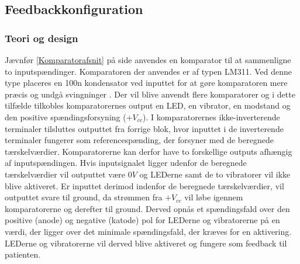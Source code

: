 \subsection{Feedbackkonfiguration}
\subsubsection{Teori og design}
Jævnfør \ref{Komparatorafsnit} på side \pageref{Komparatorafsnit} anvendes en komparator til at sammenligne to inputspændinger. Komparatoren der anvendes er af typen LM311. Ved denne type placeres en 100n kondensator ved inputtet for at gøre komparatoren mere præcis og undgå svingninger \cite{Instruments2015}. Der vil blive anvendt flere komparatorer og i dette tilfælde tilkobles komparatorernes output en LED, en vibrator, en modstand og den positive spændingsforsyning ($+V_{cc}$). I komparatorernes ikke-inverterende terminaler tilsluttes outputtet fra forrige blok, hvor inputtet i de inverterende terminaler fungerer som referencespænding, der forsyner med de beregnede tærskelværdier. Komparatorerne kan derfor have to forskellige outputs afhængig af inputspændingen. Hvis inputsignalet ligger udenfor de beregnede tærskelværdier vil outputtet være $0V$ og LEDerne samt de to vibratorer vil ikke blive aktiveret. Er inputtet derimod indenfor de beregnede tærskelværdier, vil outputtet svare til ground, da strømmen fra $+V_{cc}$ vil løbe igennem komparatorerne og derefter til ground. Derved opnås et spændingsfald over den positive (anode) og negative (katode) pol for LEDerne og vibratorerne på en værdi, der ligger over det minimale spændingsfald, der kræves for en aktivering. LEDerne og vibratorerne vil derved blive aktiveret og fungere som feedback til patienten. \\

